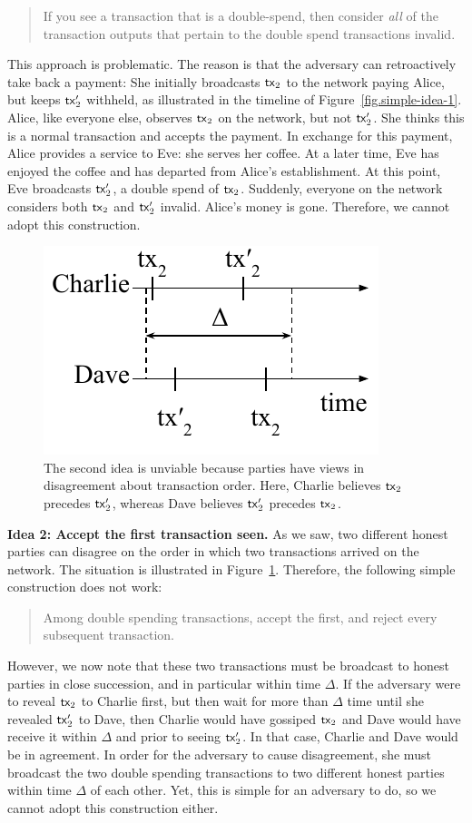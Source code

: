 \begin{quote}
If you see a transaction that is a double-spend,
then consider \emph{all} of the transaction outputs that pertain to the double spend transactions invalid.
\end{quote}

This approach is problematic. The reason is that the adversary can retroactively take back
a payment: She initially broadcasts $\mathsf{tx}_2$ to the network paying Alice, but keeps $\mathsf{tx}_2'$ withheld,
as illustrated in the timeline of Figure~\ref{fig.simple-idea-1}.
Alice, like everyone else, observes $\mathsf{tx}_2$ on the network, but not $\mathsf{tx}_2'$. She thinks this is
a normal transaction and accepts the payment. In exchange for this payment, Alice provides a service
to Eve: she serves her coffee. At a later time, Eve has enjoyed the coffee and has departed from Alice's
establishment. At this point, Eve broadcasts $\mathsf{tx}_2'$, a double spend of $\mathsf{tx}_2$. Suddenly, everyone
on the network considers both $\mathsf{tx}_2$ and $\mathsf{tx}_2'$ invalid. Alice's money is gone. Therefore, we cannot
adopt this construction.

\begin{figure}[h]
    \centering
    \includegraphics[width=0.325 \columnwidth,keepaspectratio]{figures/simple-idea-2.pdf}
    \caption{The second idea is unviable because parties
    have views in disagreement about transaction order. Here, Charlie believes $\mathsf{tx}_2$
    precedes $\mathsf{tx}_2'$, whereas Dave believes $\mathsf{tx}_2'$ precedes $\mathsf{tx}_2$.}
    \label{fig.simple-idea-2}
\end{figure}

\noindent
\textbf{Idea 2: Accept the first transaction seen.} As we saw, two different honest parties can disagree on
the order in which two transactions arrived on the network. The situation is illustrated in
Figure~\ref{fig.simple-idea-2}. Therefore, the following simple construction does not work:

\begin{quote}
  Among double spending transactions, accept the first, and reject every subsequent transaction.
\end{quote}

However, we now note that these two transactions must be broadcast
to honest parties in close succession, and in particular within time $\Delta$. If the adversary
were to reveal $\mathsf{tx}_2$ to Charlie first, but then wait for more than $\Delta$ time until she revealed
$\mathsf{tx}_2'$ to Dave, then Charlie would have gossiped $\mathsf{tx}_2$ and Dave would have receive it within $\Delta$
and prior to seeing $\mathsf{tx}_2'$. In that case, Charlie and Dave would be in agreement.
In order for the adversary to cause disagreement, she must broadcast the two double spending
transactions to two different honest parties within time $\Delta$ of each other. Yet, this is
simple for an adversary to do, so we cannot adopt this construction either.

